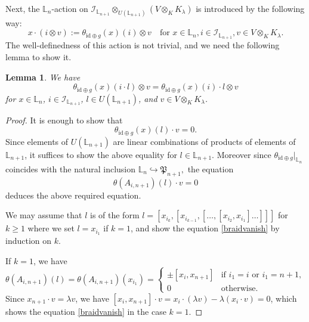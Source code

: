 \documentclass[a4paper,12pt]{article}
\newtheorem{lem}[thm]{Lemma}
\theoremstyle{definition}
\theoremstyle{remark}
\begin{document}
Next, the $\mathbb{L}_{n}$-action on $\mathcal{I}_{\mathbb{L}_{n+1}}\otimes_{U(\mathbb{L}_{n+1})} (V\otimes_{K} K_{\lambda})$
is introduced by the following way:
\[
x\cdot (i\otimes v):=\theta_{\mathrm{id}\oplus g}(x)(i)	\otimes v \quad \text{for $x\in \mathbb{L}_{n}, i\in \mathcal{I}_{\mathbb{L}_{n+1}}, v\in V\otimes_{K}K_{\lambda}$}.
\]
The well-definedness of this action is not trivial, and we need the following lemma to show it.
\begin{lem}
We have 
\[
	\theta_{\mathrm{id}\oplus g}(x)(i\cdot l)\otimes v
	=\theta_{\mathrm{id}\oplus g}(x)(i)\cdot l\otimes v 
\]
for $x\in \mathbb{L}_{n}$, $i\in \mathcal{I}_{\mathbb{L}_{n+1}}$, $l\in U(\mathbb{L}_{n+1})$, and $v\in V\otimes_{K}K_{\lambda}$.
\end{lem} 
\begin{proof}
	It is enough to show that 
	\[
		\theta_{\mathrm{id}\oplus g}(x)(l)\cdot v=0.
	\]
Since elements of $U(\mathbb{L}_{n+1})$ are linear combinations of 
products 
of elements of $\mathbb{L}_{n+1}$,
it suffices to show the above equality for 
$l\in \mathbb{L}_{n+1}$.
Moreover since $\theta_{\mathrm{id}\oplus g}|_{\mathbb{L}_{n}}$ coincides with the natural inclusion 
$
\mathbb{L}_{n}\hookrightarrow\mathfrak{P}_{n+1},
$
the equation 
\begin{equation}\label{braidvanish}
	\theta(A_{i,n+1})(l)\cdot v=0
\end{equation}
deduces the above required equation. 

We may assume that 
$l$ is of the form 
$l=[x_{i_{k}},[x_{i_{k-1}},[\ldots,[x_{i_2},x_{i_1}]\ldots]]]$
for $k\ge 1$ where we set $l=x_{i_1}$ if $k=1$,
and show the equation \eqref{braidvanish}
by induction on $k$. 

If $k=1$, we have
\[
\theta(A_{i,n+1})(l)=\theta(A_{i,n+1})(x_{i_1})=
\begin{cases}
\pm [x_{i},x_{n+1}] & \text{if $i_{1}=i$ or $i_{1}=n+1$},\\
0 & \text{otherwise}.
\end{cases}
\]
Since $x_{n+1}\cdot v=\lambda v$, 
we have $[x_{i},x_{n+1}]\cdot v=x_{i}\cdot (\lambda v)-\lambda (x_{i}\cdot v)=0$,
which shows the equation \eqref{braidvanish} in the case $k=1$.


\end{proof}
\end{document}
